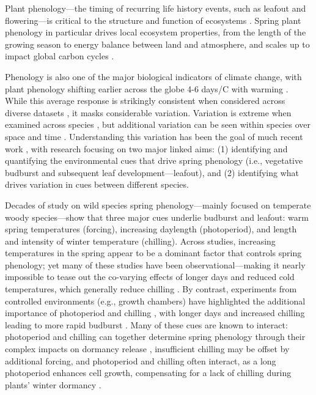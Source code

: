 \documentclass[11pt]{article}
\begin{document}
Plant phenology---the timing of recurring life history events, such as leafout and flowering---is critical to the structure and function of ecosystems \citep{Cleland:2007aa}. Spring plant phenology in particular drives local ecosystem properties, from the length of the growing season to energy balance between land and atmosphere, and scales up to impact global carbon cycles \citep{Richardson:2009aa}. %

Phenology is also one of the major biological indicators of climate change, with plant phenology shifting earlier across the globe 4-6 days/\degree C with warming \citep{IPCC:2014sm}. While this average response is strikingly consistent when considered across diverse datasets \citep{Wolkovich:2012aa}, it masks considerable variation. Variation is extreme when examined across species \citep{Wolkovich:2014ab}, but additional variation can be seen within species over space \citep{vitasselev,kramer2017} and time \citep{yu2010,fu2015}. Understanding this variation has been the goal of much recent work \citep{Rutishauser:2008fu,Laube2015,donnelly2017,zohner2017}, with research focusing on two major linked aims: (1) identifying and quantifying the environmental cues that drive spring phenology (i.e., vegetative budburst and subsequent leaf development---leafout), and (2) identifying what drives variation in cues between different species.

Decades of study on wild species spring phenology---mainly focused on temperate woody species---show that three major cues underlie budburst and leafout: warm spring temperatures (forcing), increasing daylength (photoperiod), and length and intensity of winter temperature (chilling). Across studies, increasing temperatures in the spring appear to be a dominant factor that controls spring phenology; yet many of these studies have been observational---making it nearly impossible to tease out the co-varying effects of longer days and reduced cold temperatures, which generally reduce chilling \citep{chuineJTB,Cook:2012pnas}. By contrast, experiments from controlled environments (e.g., growth chambers) have highlighted the additional importance of photoperiod and chilling \citep{Heide:1993b,Falusi:1996aa,Foley:2009aa,Ghelardini:2010aa,Caffarra:2011aa}, with longer days and increased chilling leading to more rapid budburst \citep{Caffarra:2011ab}. Many of these cues are known to interact: photoperiod and chilling can together determine spring phenology through their complex impacts on dormancy release \citep{chuineJTB}, insufficient chilling may be offset by additional forcing, and photoperiod and chilling often interact, as a long photoperiod enhances cell growth, compensating for a lack of chilling during plants' winter dormancy \citep{Heide:1993b,Myking:1995,Caffarra:2011aa}.
\end{document}
